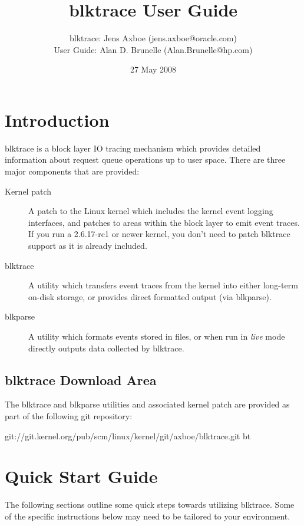 \documentclass{article}
\title{blktrace User Guide}
\author{blktrace: Jens Axboe (jens.axboe@oracle.com)\\
        User Guide: Alan D. Brunelle (Alan.Brunelle@hp.com)}
\date{27 May 2008}
\begin{document}
\maketitle
\section{\label{sec:intro}Introduction}

blktrace is a block layer IO tracing mechanism which provides detailed
information about request queue operations up to user space. There are
three major components that are provided:

\begin{description}
  \item[Kernel patch] A patch to the Linux kernel which includes the
  kernel event logging interfaces, and patches to areas within the block
  layer to emit event traces. If you run a 2.6.17-rc1 or newer kernel,
  you don't need to patch blktrace support as it is already included.

  \item[blktrace] A utility which transfers event traces from the kernel
  into either long-term on-disk storage, or provides direct formatted
  output (via blkparse).

  \item[blkparse] A utility which formats events stored in files, or when
  run in \emph{live} mode directly outputs data collected by blktrace.
\end{description}

\subsection{blktrace Download Area}

The blktrace and blkparse utilities and associated kernel patch are provided
as part of the following git repository:

git://git.kernel.org/pub/scm/linux/kernel/git/axboe/blktrace.git bt

\newpage\section{\label{sec:quick-start}Quick Start Guide}

The following sections outline some quick steps towards utilizing
blktrace. Some of the specific instructions below may need to be tailored
to your environment.
\end{document}

